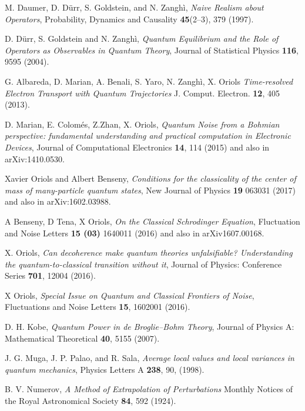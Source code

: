 \documentclass[nofootinbib, secnumarabic, amsmath, nobibnotes,10pt,aps,pra]{revtex4-1}
\begin{document}
\begin{thebibliography}{999}
M. Daumer, D. D\"{u}rr, S. Goldstein, and N. Zangh\`i, \emph{Naive Realism about Operators}, Probability, Dynamics and Causality \textbf{45}(2--3),  379 (1997).

D. D\"{u}rr, S. Goldstein and N. Zangh\`i, \emph{Quantum Equilibrium and the Role of Operators as Observables in Quantum Theory}, Journal of Statistical Physics \textbf{116},  9595 (2004).

G. Albareda, D. Marian, A. Benali, S. Yaro, N. Zangh\`i, X. Oriols \textit{Time-resolved Electron Transport with Quantum Trajectories} J. Comput. Electron. \textbf{12},  405 (2013). 

D. Marian, E. Colom\'{e}s, Z.Zhan, X. Oriols, \emph{Quantum Noise from a Bohmian perspective: fundamental understanding and practical computation in Electronic Devices}, Journal of Computational Electronics {\bf 14},  114 (2015) and also in arXiv:1410.0530.  

Xavier Oriols and Albert Benseny, \textit{Conditions for the classicality of the center of mass of many-particle quantum states}, New Journal of Physics \textbf{19}   063031 (2017) and also in arXiv:1602.03988.  

A Benseny, D Tena, X Oriols, \textit{On the Classical Schrodinger Equation}, Fluctuation and Noise Letters \textbf{15 (03)}  1640011 (2016) and also in arXiv1607.00168. 

X. Oriols, \emph{Can decoherence make quantum theories unfalsifiable? Understanding the quantum-to-classical transition without it}, Journal of Physics: Conference Series {\bf 701},  12004 (2016). 

X Oriols, \emph{Special Issue on Quantum and Classical Frontiers of Noise}, Fluctuations and Noise Letters  {\bf 15},  1602001 (2016). 

D. H. Kobe, \emph{Quantum Power in de Broglie--Bohm Theory}, Journal of Physics A: Mathematical Theoretical \textbf{40},  5155 (2007).

J. G. Muga, J. P. Palao, and R. Sala, \emph{ Average local values and local variances in quantum mechanics},  Physics Letters A {\bf 238},  90, (1998).

B. V. Numerov, \emph{A Method of Extrapolation of Perturbations} Monthly Notices of the Royal Astronomical Society \textbf{84},  592 (1924).


\end{thebibliography}
\end{document}
